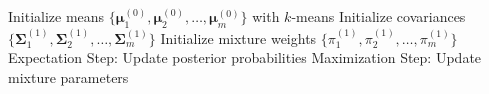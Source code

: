 \begin{algorithm}[h]
\caption{Expectation-Maximization Algorithm for \acp{GMM}}
\label{alg:chap10-em-gmm}
\begin{algorithmic}[1]
  \State Initialize means $\lbrace \boldsymbol{\mu}_{1}^{(0)}, \boldsymbol{\mu}_{2}^{(0)}, \dots, \boldsymbol{\mu}_{m}^{(0)} \rbrace$ with $k$-means 
  \State Initialize covariances $\lbrace \boldsymbol{\Sigma}_{1}^{(1)}, \boldsymbol{\Sigma}_{2}^{(1)}, \dots, \boldsymbol{\Sigma}_{m}^{(1)} \rbrace$   
  \State Initialize mixture weights $\lbrace \pi_{1}^{(1)}, \pi_{2}^{(1)}, \dots, \pi_{m}^{(1)} \rbrace$   
    \State Expectation Step: Update posterior probabilities 
    \State Maximization Step: Update mixture parameters 
  \EndWhile 
\end{algorithmic}
\end{algorithm}






